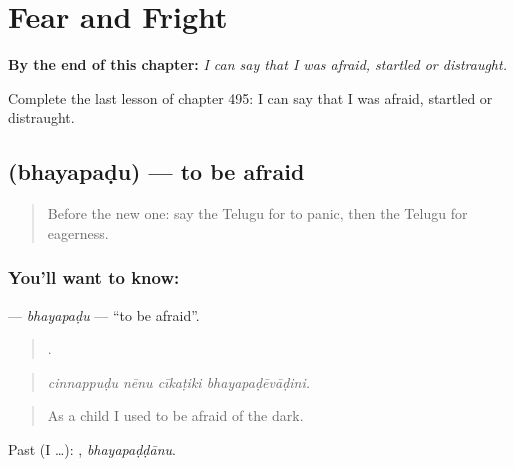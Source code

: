 
\chapter{Fear and Fright}
\label{ch:te-fear-and-fright}

\begin{chapteropening}
\textbf{By the end of this chapter:} \emph{I can say that I was afraid, startled or distraught.}

Complete the last lesson of chapter 495: I can say that I was afraid, startled or distraught.
\end{chapteropening}

\section[\texorpdfstring{\te{భయపడు} (bhayapaḍu)}{భయపడు (bhayapaḍu)}]{ (bhayapaḍu) — to be afraid}

\label{lesson:TE-C495-bhayapadu}



\begin{quote}
Before the new one: say the Telugu for to panic, then the Telugu for eagerness.
\end{quote}

\subsection*{You'll want to know: }
\textbf{} — \emph{bhayapaḍu} — \textquotedblleft{}to be afraid\textquotedblright{}.

\begin{quote}
   .
\end{quote}

\begin{quote}
\emph{cinnappuḍu nēnu cīkaṭiki bhayapaḍēvāḍini.}
\end{quote}

\begin{quote}
As a child I used to be afraid of the dark.
\end{quote}

Past (I …): , \emph{bhayapaḍḍānu}.

